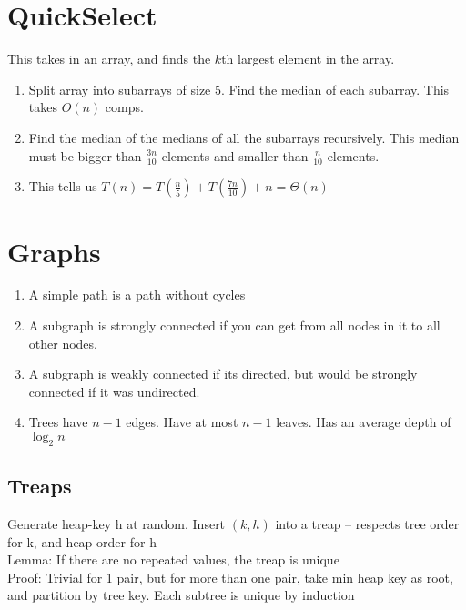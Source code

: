 \documentclass[7pt,twocolumn]{article}
\begin{document}
\section{QuickSelect}
This takes in an array, and finds the $k$th largest element in the array.
\begin{enumerate}
    \item Split array into subarrays of size 5. Find the median of each subarray. This takes $O(n)$ comps.
    \item Find the median of the medians of all the subarrays recursively. This median must be bigger than $\frac{3n}{10}$ elements and smaller than $\frac{n}{10}$ elements.
    \item This tells us $T(n) = T(\frac{n}{5}) + T(\frac{7n}{10}) + n = \Theta(n)$
\end{enumerate}

\section{Graphs}
\begin{enumerate}
    \item A simple path is a path without cycles
    \item A subgraph is strongly connected if you can get from all nodes in it to all other nodes.
    \item A subgraph is weakly connected if its directed, but would be strongly connected if it was undirected.
    \item Trees have $n-1$ edges. Have at most $n-1$ leaves. Has an average depth of $\log_2 n$
\end{enumerate}

\subsection{Treaps}
Generate heap-key h at random.  Insert $(k, h)$ into a treap -- respects tree order for k, and heap order for h\\
Lemma: If there are no repeated values, the treap is unique\\
Proof: Trivial for 1 pair, but for more than one pair, take min heap key as root, and partition by tree key.  Each subtree is unique by induction
\end{document}
